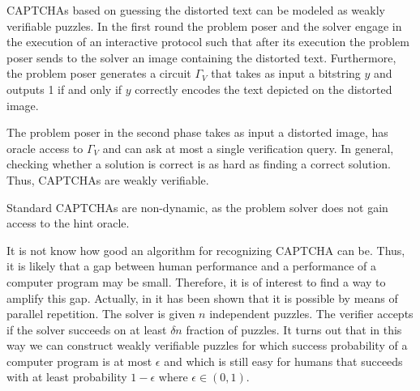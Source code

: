 CAPTCHAs based on guessing the distorted text can be modeled as weakly verifiable puzzles.
In the first round the problem poser and the solver engage in the execution of an interactive protocol
such that after its execution the problem poser sends to the solver an image containing the distorted text.
Furthermore, the problem poser generates a circuit $\Gamma_V$ that takes as input a bitstring $y$ and outputs 1 if and only if $y$ correctly encodes the
text depicted on the distorted image.

The problem poser in the second phase takes as input a distorted image, has oracle access to $\Gamma_V$ and can ask at most a single verification query.
In general, checking whether a solution is correct is as hard as finding a correct solution. Thus, CAPTCHAs are weakly verifiable.

Standard CAPTCHAs are non-dynamic, as the problem solver does not gain access to the hint oracle.

It is not know how good an algorithm for recognizing CAPTCHA can be. Thus, it is likely that a gap between human
performance and a performance of a computer program may be small. Therefore, it is of interest to find a way to amplify this gap.
Actually, in \cite{DBLP:journals/corr/abs-1002-3534} it has been shown that it is possible by means of parallel repetition.
The solver is given $n$ independent puzzles. The verifier accepts if the solver succeeds on at least $\delta n$ fraction of puzzles.
It turns out that in this way we can construct weakly verifiable puzzles for which success probability of a computer program is at most $\epsilon$ and
which is still easy for humans that succeeds with at least probability $1 - \epsilon$ where $\epsilon \in (0,1)$.


